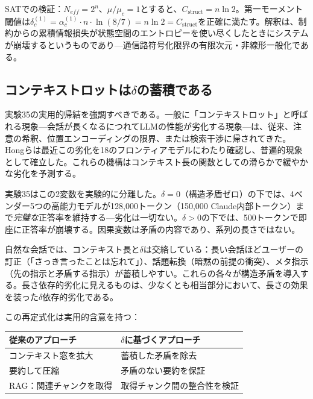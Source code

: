 \documentclass[11pt,a4paper]{article}
\begin{document}
\noindent SATでの検証：$N_{eff} = 2^n$、$\mu/\mu_c = 1$とすると、$C_{\text{struct}} = n \ln 2$。第一モーメント閾値は$\delta_c^{(1)} = \alpha_c^{(1)} \cdot n \cdot \ln(8/7) = n \ln 2 = C_{\text{struct}}$を正確に満たす。解釈は、制約からの累積情報損失が状態空間のエントロピーを使い尽くしたときにシステムが崩壊するというものであり---通信路符号化限界の有限次元・非線形一般化である。

\subsection{コンテキストロットは\texorpdfstring{$\delta$}{δ}の蓄積である}
\label{sec:context-rot}

実験35の実用的帰結を強調すべきである。一般に「コンテキストロット」と呼ばれる現象---会話が長くなるにつれてLLMの性能が劣化する現象---は、従来、注意の希釈、位置エンコーディングの限界、または検索干渉\cite{liu2024}に帰されてきた。Hongら\cite{hong2025contextrot}は最近この劣化を18のフロンティアモデルにわたり確認し、普遍的現象として確立した。これらの機構はコンテキスト長の関数としての滑らかで緩やかな劣化を予測する。

実験35はこの2変数を実験的に分離した。$\delta = 0$（構造矛盾ゼロ）の下では、4ベンダー5つの高能力モデルが128{,}000トークン（150{,}000 Claude内部トークン）まで\emph{完璧な}正答率を維持する---劣化は一切ない。$\delta > 0$の下では、500トークンで即座に正答率が崩壊する。因果変数は矛盾の内容であり、系列の長さではない。

自然な会話では、コンテキスト長と$\delta$は交絡している：長い会話ほどユーザーの訂正（「さっき言ったことは忘れて」）、話題転換（暗黙の前提の衝突）、メタ指示（先の指示と矛盾する指示）が蓄積しやすい。これらの各々が構造矛盾を導入する。長さ依存的劣化に見えるものは、少なくとも相当部分において、長さの効果を装った$\delta$依存的劣化である。

この再定式化は実用的含意を持つ：

\begin{center}
\small
\begin{tabular}{ll}
\toprule
\textbf{従来のアプローチ} & \textbf{$\delta$に基づくアプローチ} \\
\midrule
コンテキスト窓を拡大 & 蓄積した矛盾を除去 \\
要約して圧縮 & 矛盾のない要約を保証 \\
RAG：関連チャンクを取得 & 取得チャンク間の整合性を検証 \\
\bottomrule
\end{tabular}
\end{center}
\end{document}
